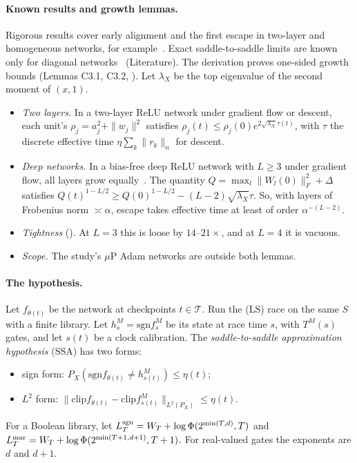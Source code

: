 \paragraph{Known results and growth lemmas.} Rigorous results cover early alignment and the first escape in two-layer and homogeneous networks, for example~\cite{boursier2022early}. Exact saddle-to-saddle limits are known only for diagonal networks~\cite{pesme2023saddle,kunin2025agf} (Literature). The derivation proves one-sided growth bounds (Lemmas C3.1, C3.2, ). Let $\lambda_X$ be the top eigenvalue of the second moment of $(x,1)$.
\begin{itemize}[nosep]
\item \emph{Two layers.} In a two-layer ReLU network under gradient flow or descent, each unit's $\rho_j=a_j^2+\|w_j\|^2$ satisfies $\rho_j(t)\le\rho_j(0)e^{2\sqrt{\lambda_X}\tau(t)}$, with $\tau$ the discrete effective time $\eta\sum_k\|r_k\|_n$ for descent.
\item \emph{Deep networks.} In a bias-free deep ReLU network with $L\ge3$ under gradient flow, all layers grow equally~\cite{du2018algorithmic}. The quantity $Q=\max_l\|W_l(0)\|_F^2+\Delta$ satisfies $Q(t)^{1-L/2}\ge Q(0)^{1-L/2}-(L-2)\sqrt{\lambda_X}\tau$. So, with layers of Frobenius norm $\asymp\alpha$, escape takes effective time at least of order $\alpha^{-(L-2)}$.
\item \emph{Tightness} (). At $L=3$ this is loose by $14$--$21\times$, and at $L=4$ it is vacuous.
\item \emph{Scope.} The study's $\mu$P Adam networks are outside both lemmas.
\end{itemize}

\paragraph{The hypothesis.} Let $f_{\theta(t)}$ be the network at checkpoints $t\in\mathcal T$. Run the (LS) race on the same $S$ with a finite library. Let $h^M_s=\mathrm{sgn}f^M_s$ be its state at race time $s$, with $T^M(s)$ gates, and let $s(t)$ be a clock calibration. The \emph{saddle-to-saddle approximation hypothesis} (SSA) has two forms:
\begin{itemize}[nosep]
\item sign form: $P_X(\mathrm{sgn}f_{\theta(t)}\ne h^M_{s(t)})\le\eta(t)$;
\item $L^2$ form: $\|\mathrm{clip}f_{\theta(t)}-\mathrm{clip}f^M_{s(t)}\|_{L^2(P_X)}\le\eta(t)$.
\end{itemize}
For a Boolean library, let $L^{\rm sgn}_T=W_T+\log\Phi(2^{\min(T,d)},T)$ and $L^{\rm mar}_T=W_T+\log\Phi(2^{\min(T+1,d+1)},T+1)$. For real-valued gates the exponents are $d$ and $d+1$.

